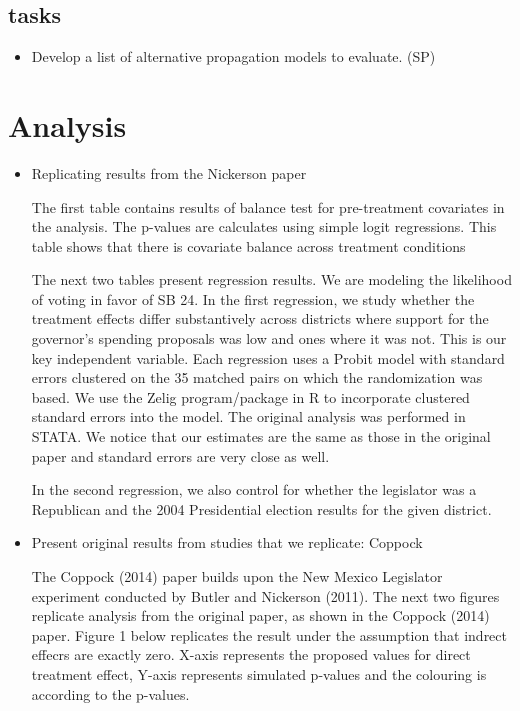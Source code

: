 \documentclass[12pt]{article}
\begin{document}
\subsection{tasks}
\begin{itemize}
\item Develop a list of alternative propagation models to evaluate. (SP)
\end{itemize}


\section{Analysis}

\begin{itemize}

\item Replicating results from the Nickerson paper


The first table contains results of balance test for pre-treatment covariates in the analysis. The p-values are calculates using simple logit regressions. This table shows that there is covariate balance across treatment conditions




The next two tables present regression results. We are modeling the likelihood of voting in favor of SB 24. In the first regression, we study whether the treatment effects differ substantively across districts where support for the governor's spending proposals was low and ones where it was not. This is our key independent variable. Each regression uses a Probit model with standard errors clustered on the 35 matched pairs on which the randomization was based. We use the Zelig program/package in R to incorporate clustered standard errors into the model. The original analysis was performed in STATA. We notice that our estimates are the same as those in the original paper and standard errors are very close as well.



In the second regression, we also control for whether the legislator was a Republican and the 2004 Presidential election results for the given district.





\item Present original results from studies that we replicate: Coppock

The Coppock (2014) paper builds upon the New Mexico Legislator experiment conducted by Butler and Nickerson (2011). The next two figures replicate analysis from the original paper, as shown in the Coppock (2014) paper. Figure 1 below replicates the result under the assumption that indrect effecrs are exactly zero. X-axis represents the proposed values for direct treatment effect, Y-axis represents simulated p-values and the colouring is according to the p-values.



\end{itemize}
\end{document}
